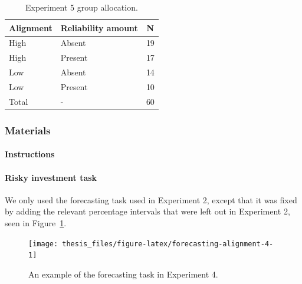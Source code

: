\documentclass[a4paper, nobind, dvipsnames]{templates/ociamthesis}
\theoremstyle{definition}
\theoremstyle{definition}
\theoremstyle{definition}
\theoremstyle{definition}
\theoremstyle{remark}
\begin{document}
\begin{table}[tbp]

\begin{center}
\begin{threeparttable}

\caption{\label{tab:condition-allocation-alignment-4}Experiment 5 group allocation.}

\begin{tabular}{lll}
\toprule
Alignment & \multicolumn{1}{c}{Reliability amount} & \multicolumn{1}{c}{N}\\
\midrule
High & Absent & 19\\
High & Present & 17\\
Low & Absent & 14\\
Low & Present & 10\\
Total & - & 60\\
\bottomrule
\end{tabular}

\end{threeparttable}
\end{center}

\end{table}

\hypertarget{materials-13}{%
\subsubsection{Materials}\label{materials-13}}

\hypertarget{instructions-8}{%
\paragraph{Instructions}\label{instructions-8}}

\hypertarget{risky-investment-task-1}{%
\paragraph{Risky investment task}\label{risky-investment-task-1}}

We only used the forecasting task used in Experiment 2, except that it was fixed
by adding the relevant percentage intervals that were left out in Experiment 2,
seen in Figure~\ref{fig:forecasting-alignment-4}.



\begin{figure}
\texttt{[image: thesis\_files/figure-latex/forecasting-alignment-4-1]} \caption{An example of the forecasting task in Experiment 4.}\label{fig:forecasting-alignment-4}
\end{figure}
\end{document}
